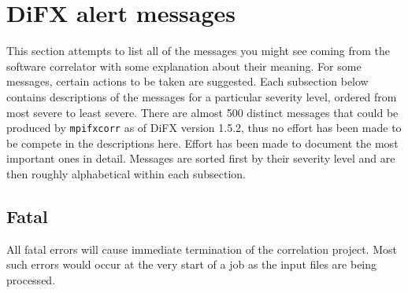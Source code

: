 \section{DiFX alert messages} \label{sec:messages}

This section attempts to list all of the messages you might see coming from the software correlator with some explanation about their meaning.
For some messages, certain actions to be taken are suggested.
Each subsection below contains descriptions of the messages for a particular severity level, ordered from most severe to least severe.
There are almost 500 distinct messages that could be produced by {\tt mpifxcorr} as of DiFX version 1.5.2, thus no effort has been made to be compete in the descriptions here.
Effort has been made to document the most important ones in detail.
Messages are sorted first by their severity level and are then roughly alphabetical within each subsection.




\subsection{Fatal}

All fatal errors will cause immediate termination of the correlation project.
Most such errors would occur at the very start of a job as the input files are being processed.

